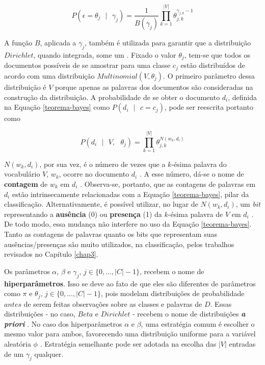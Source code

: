 \begin{equation}
\label{dirichlet}
  \ensuremath{P(\epsilon = \theta_j\mbox{ } |\mbox{ } \gamma_j) = \frac{1}{B(\gamma_j)}\prod_{k = 1}^{|V|}\theta_{j,k}^{\gamma_{j,k} - 1}}
\end{equation}

A função \ensuremath{B}, aplicada a \ensuremath{\gamma_j}, também é utilizada para garantir que a distribuição \ensuremath{Dirichlet}, quando integrada, some um \cite{stat-distribs}. Fixado o valor \ensuremath{\theta_j}, tem-se que todos os documentos possíveis de se amostrar para uma classe \ensuremath{c_j} estão distribuídos de acordo com uma distribuição \ensuremath{Multinomial(V, \theta_j)}. O primeiro parâmetro dessa distribuição é \ensuremath{V} porque apenas as palavras dos documentos são consideradas na construção da distribuição. A probabilidade de se obter o documento \ensuremath{d_i}, definida na Equação \ref{teorema-bayes} como \ensuremath{P(d_i\mbox{ }|\mbox{ }c = c_j)}, pode ser reescrita portanto como \cite{resnik}

\begin{equation}
\label{multinomial}
\ensuremath{P(d_i\mbox{ } |\mbox{ } V,\mbox{ } \theta_j)  = \prod_{k = 1}^{|V|}\theta_{j,k}^{N(w_k, d_i)}}
\end{equation}

\ensuremath{N(w_k, d_i)}, por sua vez, é o número de vezes que a \ensuremath{k}-ésima palavra do vocabulário \ensuremath{V}, \ensuremath{w_k}, ocorre no documento \ensuremath{d_i} \cite{resnik}. A esse número, dá-se o nome de \textbf{contagem} de \ensuremath{w_k} em \ensuremath{d_i} \cite{nigam}. Observa-se, portanto, que as contagens de palavras em \ensuremath{d_i} estão intrinsecamente relacionadas com a Equação \ref{teorema-bayes}, pilar da classificação. Alternativamente, é possível utilizar, no lugar de \ensuremath{N(w_k, d_i)}, um \emph{bit} representando a \textbf{ausência} (0) ou \textbf{presença} (1) da \ensuremath{k}-ésima palavra de \ensuremath{V} em \ensuremath{d_i} \cite{mccallum-nigam}. De todo modo, essa mudança não interfere no uso da Equação \ref{teorema-bayes}. Tanto as contagens de palavras quanto os bits que representam suas ausências/presenças são muito utilizados, na classificação, pelos trabalhos revisados no Capítulo \ref{chap3}.

Os parâmetros \ensuremath{\alpha}, \ensuremath{\beta} e \ensuremath{\gamma_j}, \ensuremath{j \in \{0, ..., |C| - 1\}}, recebem o nome de \textbf{hiperparâmetros}. Isso se deve ao fato de que eles são diferentes de parâmetros como \ensuremath{\pi} e \ensuremath{\theta_j}, \ensuremath{j \in \{0, ..., |C| - 1\}}, pois modelam distribuições de probabilidade \ensuremath{antes} de serem feitas observações sobre as classes e palavras de \ensuremath{D}. Essas distribuições - no caso, \ensuremath{Beta} e \ensuremath{Dirichlet} - recebem o nome de distribuições \textbf{\emph{a priori}} \cite{bishop}. No caso dos hiperparâmetros \ensuremath{\alpha} e \ensuremath{\beta}, uma estratégia comum é escolher o mesmo valor para ambos, favorecendo uma distribuição uniforme para a variável aleatória \ensuremath{\phi} \cite{nigam}. Estratégia semelhante pode ser adotada na escolha das \ensuremath{|V|} entradas de um \ensuremath{\gamma_j} qualquer.

